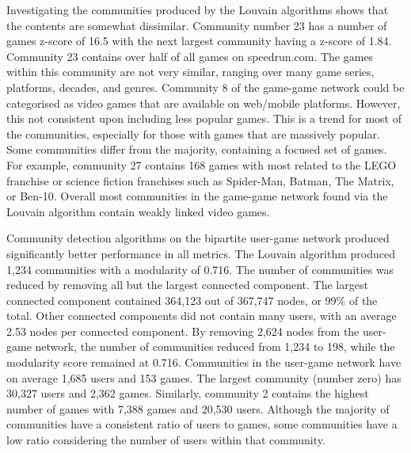 Investigating the communities produced by the Louvain algorithms shows that the contents are somewhat dissimilar. Community number 23 has a number of games z-score of 16.5 with the next largest community having a z-score of 1.84. Community 23 contains over half of all games on speedrun.com. The games within this community are not very similar, ranging over many game series, platforms, decades, and genres. Community 8 of the game-game network could be categorised as video games that are available on web/mobile platforms. However, this not consistent upon including less popular games. This is a trend for most of the communities, especially for those with games that are massively popular. Some communities differ from the majority, containing a focused set of games. For example, community 27 contains 168 games with most related to the LEGO franchise or science fiction franchises such as Spider-Man, Batman, The Matrix, or Ben-10. Overall most communities in the game-game network found via the Louvain algorithm contain weakly linked video games. 


Community detection algorithms on the bipartite user-game network produced significantly better performance in all metrics. The Louvain algorithm produced 1,234 communities with a modularity of 0.716. The number of communities was reduced by removing all but the largest connected component. The largest connected component contained 364,123 out of 367,747 nodes, or 99\% of the total. Other connected components did not contain many users, with an average 2.53 nodes per connected component. By removing 2,624 nodes from the user-game network, the number of communities reduced from 1,234 to 198, while the modularity score remained at 0.716. Communities in the user-game network have on average 1,685 users and 153 games. The largest community (number zero) has 30,327 users and 2,362 games. Similarly, community 2 contains the highest number of games with 7,388 games and 20,530 users. Although the majority of communities have a consistent ratio of users to games, some communities have a low ratio considering the number of users within that community. 



